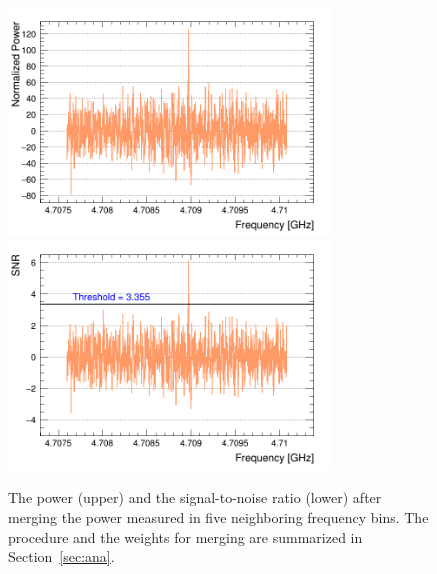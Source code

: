 \begin{figure}[htbp]                                                                                                  
    \centering                                                                                                                       
    \includegraphics[width=8.6cm]{figures/Power_GrandSpectrum_FaxionRun_AllSteps_Rescan_Merged_5bin_SG4_W201_LqWeight.png}
    \includegraphics[width=8.6cm]{figures/SNR_GrandSpectrum_FaxionRun_AllSteps_Rescan_Merged_5bin_SG4_W201_LqWeight.png}
    \caption{The power (upper) and the signal-to-noise ratio (lower) after merging the power measured in five 
neighboring frequency bins. The procedure and the weights for merging 
are summarized in Section~\ref{sec:ana}.}                
\label{fig:faxionmerge}    
\end{figure}                       

   
